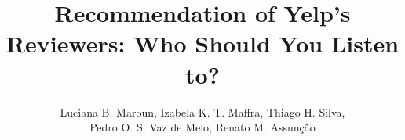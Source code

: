 \documentclass[12pt]{article}
\title{Recommendation of Yelp's Reviewers: Who Should You Listen to?}
\author{Luciana B. Maroun\inst{1}, Izabela K. T. Maffra\inst{1}, Thiago H. Silva\inst{1},\\
  Pedro O. S. Vaz de Melo\inst{1}, Renato M. Assun\c{c}\~{a}o\inst{1}}
\begin{document}
 

\maketitle

\renewcommand{\figurename}{Figure}
\renewcommand{\tablename}{Table}














\renewcommand\refname{References}

\end{document}
